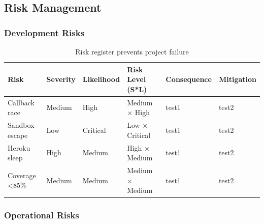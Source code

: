 \documentclass{article}
\begin{document}





\subsection{Risk Management} 

\subsubsection{Development Risks}  %

\begin{table}[H]
\centering
\begin{tabular}{|l|l|l|l|l|l|}
\hline
\textbf{Risk} & \textbf{Severity} & \textbf{Likelihood} & 
\textbf{Risk Level (S*L)} & \textbf{Consequence} & \textbf{Mitigation}\\ 
\hline
Callback race  & Medium & High     & Medium $\times$ High   & test1 & test2 \\
Sandbox escape & Low    & Critical & Low $\times$ Critical  & test1 & test2 \\
Heroku sleep   & High   & Medium   & High $\times$ Medium   & test1 & test2\\
Coverage <85\% & Medium & Medium   & Medium $\times$ Medium & test1 & test2 \\
\hline
\end{tabular}
\caption{Risk register prevents project failure}
\end{table}




\subsubsection{Operational Risks}
\end{document}

